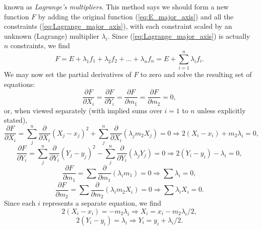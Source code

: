 known as \emph{Lagrange's multipliers}.  This method says we should form a new function $F$ by adding the 
original function (\ref{eq:E_major_axis}) and all the constraints (\ref{eq:Lagrange_major_axis}), with each constraint scaled by an unknown 
(Lagrange) multiplier $\lambda _i$.  Since (\ref{eq:Lagrange_major_axis}) is actually $n$ constraints, we find
\begin{equation}
F = E + \lambda_1 f_1 + \lambda_2 f_2 + \ldots + \lambda_n f_n = E + \sum ^n _{i=1} \lambda_i f_i.
\label{eq:MA_partials}
\end{equation}	 
We may now set the partial derivatives of $F$ to zero and solve the resulting set of equations:
\begin{equation}
\frac{\partial F}{\partial X_i} = \frac{\partial F}{\partial Y_i} = \frac{\partial F}{\partial m_1} = \frac{\partial F}{\partial m_2} = 0,
\end{equation}
or, when viewed separately (with implied sums over $i = 1$ to $n$ unless explicitly stated), 
\begin{equation}
\frac{\partial F}{\partial X_i} = \sum_j^n \frac{\partial}{\partial X_i} ( X_j - x_j)^2  + \sum_j^n \frac{\partial}{\partial X_i}
(\lambda_j m_2 X_j) = 0 \Rightarrow 2(X_i - x_i) + m_2 \lambda_i = 0,
\end{equation}
\begin{equation}
\frac{\partial F}{\partial Y_i} = \sum_j^n \frac{\partial}{\partial Y_i} ( Y_j - y_j)^2  - \sum_j^n \frac{\partial}{\partial Y_i}
(\lambda_j Y_j) = 0  \Rightarrow 2(Y_i - y_i) -  \lambda_i = 0,
\end{equation}
\begin{equation}
\frac{\partial F}{\partial m_1} = \sum  \frac{\partial}{\partial m_1} (\lambda_i m_1) = 0  \Rightarrow \sum \lambda_i  = 0,
\label{eq:lambda_major}
\end{equation}
\begin{equation}
\frac{\partial F}{\partial m_2} = \sum \frac{\partial}{\partial m_2}(\lambda_i m_2 X_i) = 0  \Rightarrow \sum \lambda_i X_i = 0.
\label{eq:lambda_x_major}
\end{equation}
Since each $i$ represents a separate equation, we find
\begin{equation}
2(X_i - x_i) = -m_2 \lambda_i \Rightarrow X_i = x_i - m_2 \lambda_i/2,
\label{eq:Xisolution}
\end{equation}
\begin{equation}
2(Y_i - y_i) = \lambda_i \Rightarrow Y_i = y_i + \lambda_i/2.
\end{equation}	 
